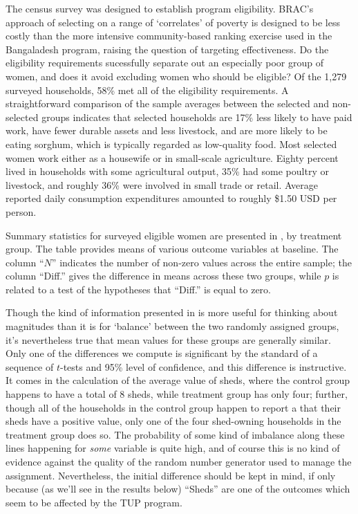 \documentclass[11pt]{article}
\begin{document}
The census survey was designed to establish program eligibility.
BRAC's approach of selecting on a range of `correlates' of poverty
is designed to be less costly than the more intensive
community-based ranking exercise used in the Bangaladesh program,
raising the question of targeting effectiveness.  Do the eligibility
requirements sucessfully separate out an especially poor group of
women, and does it avoid excluding women who should be eligible? Of
the 1,279 surveyed households, 58\% met all of the eligibility
requirements.  A straightforward comparison of the sample averages
between the selected and non-selected groups indicates that selected
households are 17\% less likely to have paid work, have fewer
durable assets and less livestock, and are more likely to be eating
sorghum, which is typically regarded as low-quality food.  Most
selected women work either as a housewife or in small-scale
agriculture. Eighty percent lived in households with some
agricultural output, 35\% had some poultry or livestock, and roughly
36\% were involved in small trade or retail.  Average reported daily
consumption expenditures amounted to roughly \$1.50 USD per person.

Summary statistics for surveyed eligible women are presented in
, by treatment group.  The table provides
means of various outcome variables at baseline.  The column ``\(N\)''
indicates the number of non-zero values across the entire sample;
the column ``Diff.'' gives the difference in means across these two
groups, while \(p\) is related to a test of the hypotheses that
``Diff.'' is equal to zero.

Though the kind of information presented in  is
more useful for thinking about magnitudes than it is for `balance'
between the two randomly assigned groups, it's nevertheless true
that mean values for these groups are generally similar.  Only one
of the differences we compute is significant by the standard of a
sequence of \(t\)-tests and 95\% level of confidence, and this
difference is instructive.  It comes in the calculation of the
average value of sheds, where the control group happens to have a
total of 8 sheds, while treatment group has only four; further,
though all of the households in the control group happen to report a
that their sheds have a positive value, only one of the four
shed-owning households in the treatment group does so.  The
probability of some kind of imbalance along these lines happening
for \emph{some} variable is quite high, and of course this is no kind of
evidence against the quality of the random number generator used to
manage the assignment.  Nevertheless, the initial difference should
be kept in mind, if only because (as we'll see in the results below)
``Sheds'' are one of the outcomes which seem to be affected by the TUP
program.
\end{document}
